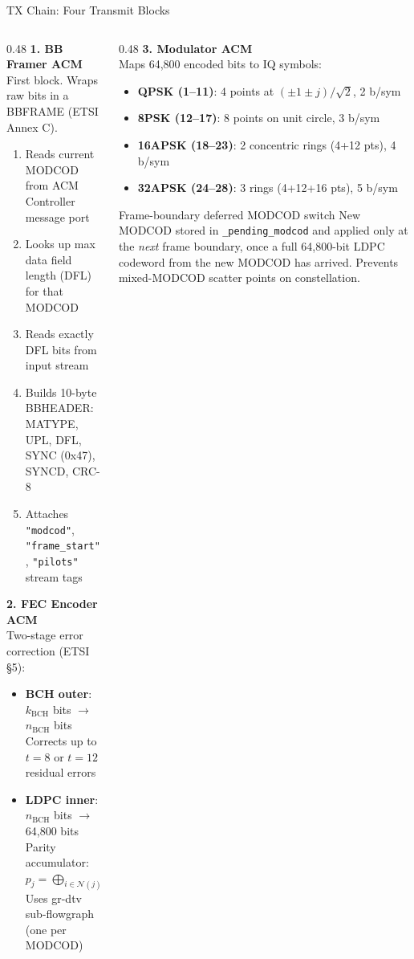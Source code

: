 \documentclass[aspectratio=169,10pt]{beamer}
\begin{document}
\begin{frame}{TX Chain: Four Transmit Blocks}
  \begin{columns}[T]
    \begin{column}{0.48\textwidth}
      \textbf{1. BB Framer ACM}\\
      \scriptsize First block. Wraps raw bits in a BBFRAME (ETSI Annex C).
      \begin{enumerate}\scriptsize
        \item Reads current MODCOD from ACM Controller message port
        \item Looks up max data field length (DFL) for that MODCOD
        \item Reads exactly DFL bits from input stream
        \item Builds 10-byte BBHEADER: MATYPE, UPL, DFL, SYNC (0x47), SYNCD, CRC-8
        \item Attaches \texttt{"modcod"}, \texttt{"frame\_start"}, \texttt{"pilots"} stream tags
      \end{enumerate}

      \vspace{0.3em}
      \textbf{2. FEC Encoder ACM}\\
      \scriptsize Two-stage error correction (ETSI §5):
      \begin{itemize}\scriptsize
        \item \textbf{BCH outer}: $k_\text{BCH}$ bits $\to$ $n_\text{BCH}$ bits\\
              Corrects up to $t=8$ or $t=12$ residual errors
        \item \textbf{LDPC inner}: $n_\text{BCH}$ bits $\to$ 64,800 bits\\
              Parity accumulator: $p_j = \bigoplus_{i \in \mathcal{N}(j)} b_i$\\
              Uses gr-dtv sub-flowgraph (one per MODCOD)
      \end{itemize}
    \end{column}
    \begin{column}{0.48\textwidth}
      \textbf{3. Modulator ACM}\\
      \scriptsize Maps 64,800 encoded bits to IQ symbols:
      \begin{itemize}\scriptsize
        \item \textbf{QPSK (1--11)}: 4 points at $(\pm1\pm j)/\sqrt{2}$, 2 b/sym
        \item \textbf{8PSK (12--17)}: 8 points on unit circle, 3 b/sym
        \item \textbf{16APSK (18--23)}: 2 concentric rings (4+12 pts), 4 b/sym
        \item \textbf{32APSK (24--28)}: 3 rings (4+12+16 pts), 5 b/sym
      \end{itemize}
      \begin{alertblock}{\scriptsize Frame-boundary deferred MODCOD switch}
        \scriptsize New MODCOD stored in \texttt{\_pending\_modcod} and applied only at
        the \emph{next} frame boundary, once a full 64,800-bit LDPC codeword from the
        new MODCOD has arrived. Prevents mixed-MODCOD scatter points on constellation.
      \end{alertblock}


\end{column}
\end{columns}
\end{frame}
\end{document}
